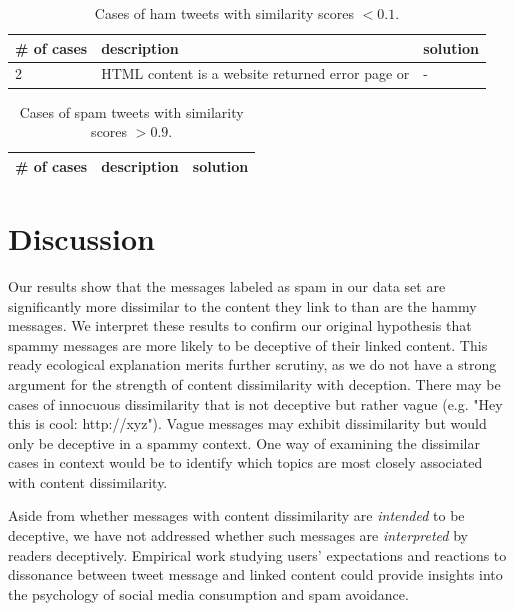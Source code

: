 \documentclass[times, 11pt, twocolumn]{article}
\begin{document}
\begin{table}[!h]\centering
	\begin{tabular}{|p{1cm}|p{3cm}|p{3cm}|}
	\hline
	# of cases & description & solution \\
	\hline
	2 & HTML content is a website returned error page or  & - \\
	\hline
	\end{tabular}
	\caption{Cases of ham tweets with similarity scores $< 0.1$.}
	\label{low-sim-ham}
\end{table}

\begin{table}[!h]\centering
	\begin{tabular}{|p{1cm}|p{3cm}|p{3cm}|}
	\hline
	# of cases & description & solution \\
	\hline

	\hline
	\end{tabular}
	\caption{Cases of spam tweets with similarity scores $>0.9$.}
	\label{high-sim-spam}
\end{table}

\section{Discussion}

Our results show that the messages labeled as spam in our data set are significantly more dissimilar
to the content they link to than are the hammy messages.
We interpret these results to confirm our original hypothesis that spammy messages are more likely to be
deceptive of their linked content.
This ready ecological explanation merits further scrutiny, as we do not have a strong 
argument for the strength of content dissimilarity with deception.
There may be cases of innocuous dissimilarity that is not deceptive but rather vague (e.g. "Hey this is cool: http://xyz").
Vague messages may exhibit dissimilarity but would only be deceptive in a spammy context.
One way of examining the dissimilar cases in context would be to identify which topics are most closely
associated with content dissimilarity.

Aside from whether messages with content dissimilarity are \emph{intended} to be deceptive,
we have not addressed whether such messages are \emph{interpreted} by readers deceptively.
Empirical work studying users' expectations and reactions to dissonance between tweet message
and linked content could provide insights into the psychology of social media consumption
and spam avoidance.
\end{document}
